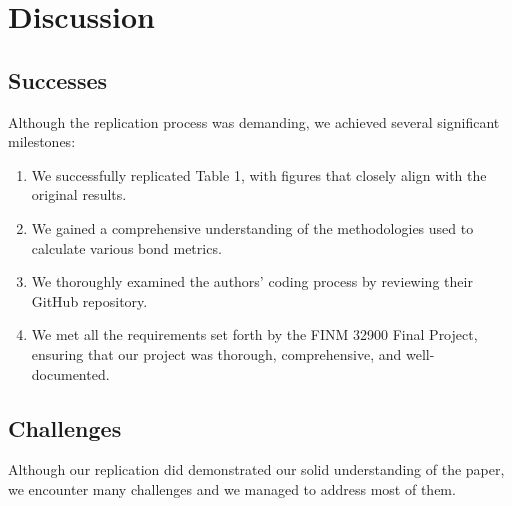 \documentclass[12pt]{article}
\begin{document}
\section{Discussion}

\subsection{Successes}
    Although the replication process was demanding, we achieved several significant milestones:
    \begin{enumerate}
    \item We successfully replicated Table 1, with figures that closely align with the original results.
    \item We gained a comprehensive understanding of the methodologies used to calculate various bond metrics.
    \item We thoroughly examined the authors' coding process by reviewing their GitHub repository.
    \item We met all the requirements set forth by the FINM 32900 Final Project, ensuring that our project was thorough, comprehensive, and well-documented.
\end{enumerate}


\subsection{Challenges}
Although our replication did demonstrated our solid understanding of the paper, we encounter many challenges and we managed to address most of them. 
\end{document}
